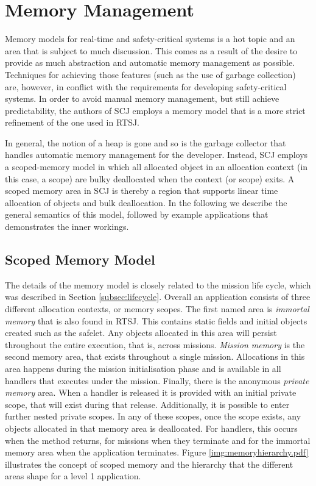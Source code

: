 \section{Memory Management}
\label{section:memoryManagement}
Memory models for real-time and safety-critical systems is a hot topic and an area that is subject to much discussion. This comes as a result of the desire to provide as much abstraction and automatic memory management as possible. Techniques for achieving those features (such as the use of garbage collection) are, however, in conflict with the requirements for developing safety-critical systems. In order to avoid manual memory management, but still achieve predictability, the authors of SCJ employs a memory model that is a more strict refinement of the one used in RTSJ.

In general, the notion of a heap is gone and so is the garbage collector that handles automatic memory management for the developer. Instead, SCJ employs a scoped-memory model in which all allocated object in an allocation context (in this case, a scope) are bulky deallocated when the context (or scope) exits. A scoped memory area in SCJ is thereby a region that supports linear time allocation of objects and bulk deallocation\cite{Schoeberl:2007:GCS:1288940.1288953}. In the following we describe the general semantics of this model, followed by example applications that demonstrates the inner workings.

\subsection{Scoped Memory Model} %
\label{sub:scoped_memory_model}
The details of the memory model is closely related to the mission life cycle, which was described in Section \ref{subsec:lifecycle}. Overall an application consists of three different allocation contexts, or memory scopes. The first named area is \textit{immortal memory} that is also found in RTSJ. This contains static fields and initial objects created such as the safelet. Any objects allocated in this area will persist throughout the entire execution, that is, across missions. \textit{Mission memory} is the second memory area, that exists throughout a single mission. Allocations in this area happens during the mission initialisation phase and is available in all handlers that executes under the mission. Finally, there is the anonymous \textit{private memory} area. When a handler is released it is provided with an initial private scope, that will exist during that release. Additionally, it is possible to enter further nested private scopes. In any of these scopes, once the scope exists, any objects allocated in that memory area is deallocated. For handlers, this occurs when the  method returns, for missions when they terminate and for the immortal memory area when the application terminates. Figure \ref{img:memoryhierarchy.pdf} illustrates the concept of scoped memory and the hierarchy that the different areas shape for a level 1 application.

